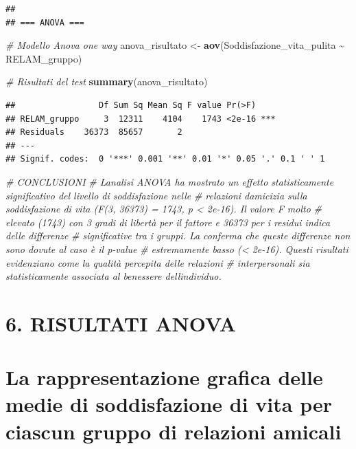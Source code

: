\documentclass[
]{article}
\newenvironment{Shaded}{\begin{snugshade}}{\end{snugshade}}
\newcommand{\CommentTok}[1]{\textcolor[rgb]{0.56,0.35,0.01}{\textit{#1}}}
\newcommand{\FunctionTok}[1]{\textcolor[rgb]{0.13,0.29,0.53}{\textbf{#1}}}
\newcommand{\NormalTok}[1]{#1}
\newcommand{\OtherTok}[1]{\textcolor[rgb]{0.56,0.35,0.01}{#1}}
\newcommand{\SpecialCharTok}[1]{\textcolor[rgb]{0.81,0.36,0.00}{\textbf{#1}}}
\begin{document}
\begin{verbatim}
## 
## === ANOVA ===
\end{verbatim}

\begin{Shaded}
\begin{Highlighting}[]
\CommentTok{\# Modello Anova one way}
\NormalTok{anova\_risultato }\OtherTok{\textless{}{-}} \FunctionTok{aov}\NormalTok{(Soddisfazione\_vita\_pulita }\SpecialCharTok{\textasciitilde{}}\NormalTok{ RELAM\_gruppo)}

\CommentTok{\# Risultati del test}
\FunctionTok{summary}\NormalTok{(anova\_risultato)}
\end{Highlighting}
\end{Shaded}

\begin{verbatim}
##                 Df Sum Sq Mean Sq F value Pr(>F)    
## RELAM_gruppo     3  12311    4104    1743 <2e-16 ***
## Residuals    36373  85657       2                   
## ---
## Signif. codes:  0 '***' 0.001 '**' 0.01 '*' 0.05 '.' 0.1 ' ' 1
\end{verbatim}

\begin{Shaded}
\begin{Highlighting}[]
\CommentTok{\# CONCLUSIONI}
\CommentTok{\# L\textquotesingle{}analisi ANOVA ha mostrato un effetto statisticamente significativo del livello di soddisfazione nelle}
\CommentTok{\# relazioni d\textquotesingle{}amicizia sulla soddisfazione di vita (F(3, 36373) = 1743, p \textless{} 2e{-}16). Il valore F molto }
\CommentTok{\# elevato (1743) con 3 gradi di libertà per il fattore e 36373 per i residui indica delle differenze }
\CommentTok{\# significative tra i gruppi. La conferma che queste differenze non sono dovute al caso è il p{-}value}
\CommentTok{\# estremamente basso (\textless{} 2e{-}16). Questi risultati evidenziano come la qualità percepita delle relazioni }
\CommentTok{\# interpersonali sia statisticamente associata al benessere dell\textquotesingle{}individuo.}
\end{Highlighting}
\end{Shaded}

\section{6. RISULTATI ANOVA}\label{risultati-anova}

\section{La rappresentazione grafica delle medie di soddisfazione di
vita per ciascun gruppo di relazioni
amicali}\label{la-rappresentazione-grafica-delle-medie-di-soddisfazione-di-vita-per-ciascun-gruppo-di-relazioni-amicali}
\end{document}
